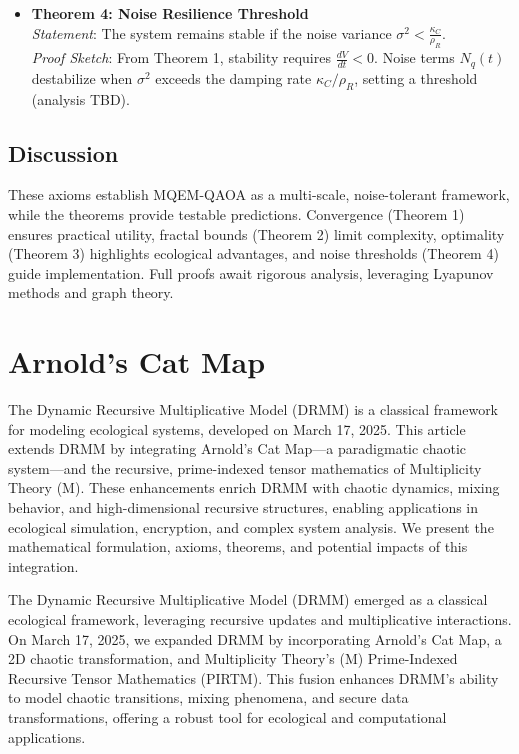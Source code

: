 \documentclass{article}
\theoremstyle{plain}
\begin{document}
\begin{itemize}
    \item \textbf{Theorem 4: Noise Resilience Threshold} \\
    \textit{Statement}: The system remains stable if the noise variance \( \sigma^2 < \frac{\kappa_C}{\rho_R} \). \\
    \textit{Proof Sketch}: From Theorem 1, stability requires \( \frac{dV}{dt} < 0 \). Noise terms \( N_q(t) \) destabilize when \( \sigma^2 \) exceeds the damping rate \( \kappa_C / \rho_R \), setting a threshold (analysis TBD).
\end{itemize}

\subsection{Discussion}
These axioms establish MQEM-QAOA as a multi-scale, noise-tolerant framework, while the theorems provide testable predictions. Convergence (Theorem 1) ensures practical utility, fractal bounds (Theorem 2) limit complexity, optimality (Theorem 3) highlights ecological advantages, and noise thresholds (Theorem 4) guide implementation. Full proofs await rigorous analysis, leveraging Lyapunov methods and graph theory.

\section{Arnold’s Cat Map}
The Dynamic Recursive Multiplicative Model (DRMM) is a classical framework for modeling ecological systems, developed on March 17, 2025. This article extends DRMM by integrating Arnold’s Cat Map—a paradigmatic chaotic system—and the recursive, prime-indexed tensor mathematics of Multiplicity Theory (M). These enhancements enrich DRMM with chaotic dynamics, mixing behavior, and high-dimensional recursive structures, enabling applications in ecological simulation, encryption, and complex system analysis. We present the mathematical formulation, axioms, theorems, and potential impacts of this integration.

The Dynamic Recursive Multiplicative Model (DRMM) emerged as a classical ecological framework, leveraging recursive updates and multiplicative interactions. On March 17, 2025, we expanded DRMM by incorporating Arnold’s Cat Map, a 2D chaotic transformation, and Multiplicity Theory’s (M) Prime-Indexed Recursive Tensor Mathematics (PIRTM). This fusion enhances DRMM’s ability to model chaotic transitions, mixing phenomena, and secure data transformations, offering a robust tool for ecological and computational applications.
\end{document}
